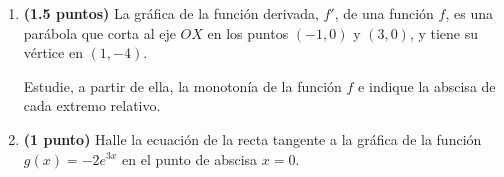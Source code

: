 
\begin{enumerate}[label=\alph*)]
\item \textbf{(1.5 puntos)} La gráfica de la función derivada, $f'$, de una función $f$, es una parábola que corta al eje $OX$ en los puntos $(-1,0)$ y $(3,0)$, y tiene su vértice en $(1,-4)$.

Estudie, a partir de ella, la monotonía de la función $f$ e indique la abscisa de cada extremo relativo.
\item \textbf{(1 punto)} Halle la ecuación de la recta tangente a la gráfica de la función $g(x)=-2e^{3x}$ en el punto de abscisa $x=0$.
\end{enumerate}
